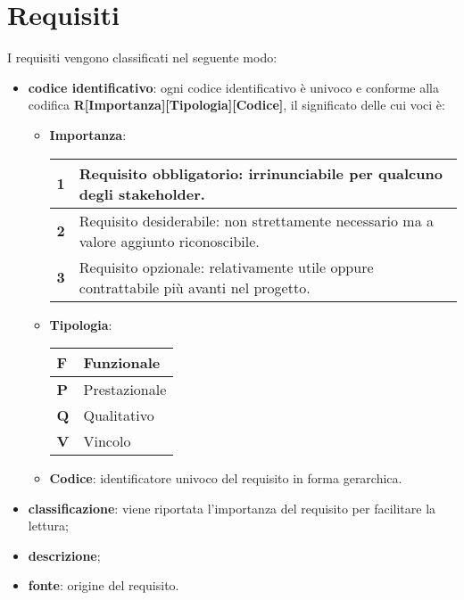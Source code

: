 \section{Requisiti}
I requisiti vengono classificati nel seguente modo:
\begin{itemize}
	\item \textbf{codice identificativo}: ogni codice identificativo è univoco e conforme alla codifica \textbf{R[Importanza][Tipologia][Codice]}, il significato delle cui voci è:
	\begin{itemize}
		\item \textbf{Importanza}:
		\begin{center}
            \renewcommand{\arraystretch}{1.5}
            \begin{tabular}{ | m{2em} | m{25em} | }
                \hline
                \textbf{1} & Requisito obbligatorio: irrinunciabile per qualcuno degli stakeholder. \\
                \hline
                \textbf{2} & Requisito desiderabile: non strettamente necessario ma  a valore aggiunto riconoscibile. \\
                \hline
                \textbf{3} &  Requisito opzionale: relativamente utile oppure contrattabile più avanti nel progetto. \\
                \hline
               \end{tabular}
            \end{center}

		\item \textbf{Tipologia}:
		\begin{center}
            \renewcommand{\arraystretch}{1.5}
            \begin{tabular}{ | m{2em} | m{10em} | }
                \hline
                \textbf{F} & Funzionale \\
                \hline
                \textbf{P} & Prestazionale \\
                \hline
                \textbf{Q} & Qualitativo \\
                \hline
                \textbf{V} &  Vincolo \\
                \hline
               \end{tabular}
            \end{center}
		\item \textbf{Codice}: identificatore univoco del requisito in forma gerarchica.
	\end{itemize}
	\item \textbf{classificazione}: viene riportata l'importanza del requisito per facilitare la lettura;
	\item \textbf{descrizione};
	\item \textbf{fonte}: origine del requisito.
\end{itemize}

